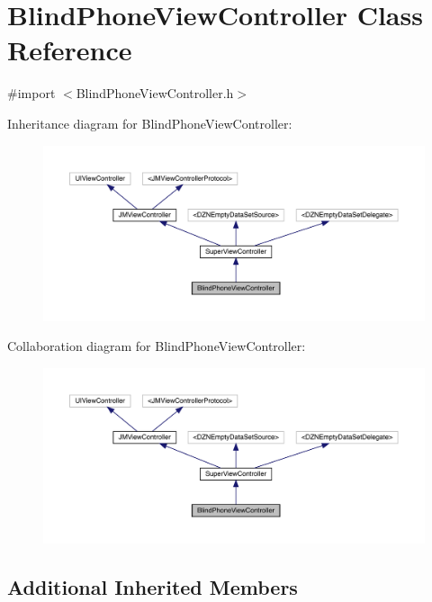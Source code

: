 \hypertarget{interface_blind_phone_view_controller}{}\section{Blind\+Phone\+View\+Controller Class Reference}
\label{interface_blind_phone_view_controller}


{\ttfamily \#import $<$Blind\+Phone\+View\+Controller.\+h$>$}



Inheritance diagram for Blind\+Phone\+View\+Controller\+:\nopagebreak
\begin{figure}[H]
\begin{center}
\leavevmode
\includegraphics[width=350pt]{interface_blind_phone_view_controller__inherit__graph}
\end{center}
\end{figure}


Collaboration diagram for Blind\+Phone\+View\+Controller\+:\nopagebreak
\begin{figure}[H]
\begin{center}
\leavevmode
\includegraphics[width=350pt]{interface_blind_phone_view_controller__coll__graph}
\end{center}
\end{figure}
\subsection*{Additional Inherited Members}


